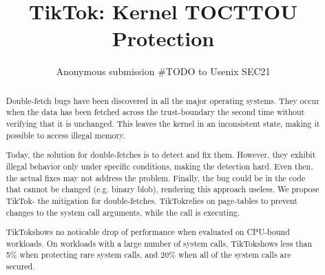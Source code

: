\usepackage{listings}
\usepackage{parcolumns}
\usepackage{graphicx}
\usepackage{caption}
\usepackage{subcaption}
\usepackage{cleveref}

\newcommand{\pra}[1]{\textcolor{blue}{\textbf{PS:} #1}}
\newcommand{\nb}[1]{\textcolor{green}{\textbf{NB}: #1}}
\newcommand{\mat}[1]{\textcolor{red}{\textbf{Mat:} #1}}

\newcommand{\sysname}{TikTok}




\date{}

\title{\Large \bf TikTok: Kernel TOCTTOU Protection}

\author{
Anonymous submission \#TODO to Usenix SEC21
} %

\maketitle

\begin{abstract}

Double-fetch bugs have been discovered in all the major operating systems.
They occur when the data has been fetched across the trust-boundary the second
time without verifying that it is unchanged. This leaves the kernel in an
inconsistent state, making it possible to access illegal memory.

Today, the solution for double-fetches is to detect and fix them. However, they
exhibit illegal behavior only under specific conditions, making the detection
hard. Even then, the actual fixes may not address the problem. Finally, the bug
could be in the code that cannot be changed (e.g. binary blob), rendering this
approach useless. We propose \sysname - the mitigation for double-fetches.
\sysname relies on page-tables to prevent changes to the system call arguments,
while the call is executing.

\sysname shows no noticable drop of performance when evaluated on CPU-bound
workloads. On workloads with a large number of system calls, \sysname shows less
than 5\% when protecting rare system calls, and 20\% when all of the system
calls are secured.


\end{abstract}
